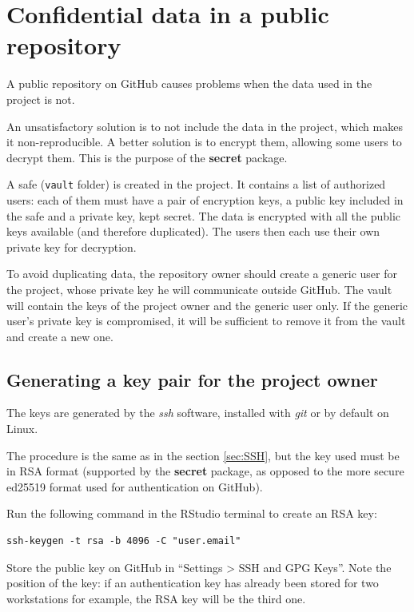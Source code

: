 \documentclass[
  12pt,
  american,
  a4paper,
  extrafontsizes,onecolumn,openright
  ]{memoir}
\begin{document}
\section{Confidential data in a public repository}\label{sec:confidential}

A public repository on GitHub causes problems when the data used in the project is not.

An unsatisfactory solution is to not include the data in the project, which makes it non-reproducible.
A better solution is to encrypt them, allowing some users to decrypt them.
This is the purpose of the \textbf{secret} package.

A safe (\texttt{vault} folder) is created in the project.
It contains a list of authorized users: each of them must have a pair of encryption keys, a public key included in the safe and a private key, kept secret.
The data is encrypted with all the public keys available (and therefore duplicated).
The users then each use their own private key for decryption.

To avoid duplicating data, the repository owner should create a generic user for the project, whose private key he will communicate outside GitHub.
The vault will contain the keys of the project owner and the generic user only.
If the generic user's private key is compromised, it will be sufficient to remove it from the vault and create a new one.

\subsection{Generating a key pair for the project owner}\label{generating-a-key-pair-for-the-project-owner}

The keys are generated by the \emph{ssh} software, installed with \emph{git} or by default on Linux.

The procedure is the same as in the section \ref{sec:SSH}, but the key used must be in RSA format (supported by the \textbf{secret} package, as opposed to the more secure ed25519 format used for authentication on GitHub).

Run the following command in the RStudio terminal to create an RSA key:

\begin{verbatim}
ssh-keygen -t rsa -b 4096 -C "user.email"
\end{verbatim}

Store the public key on GitHub in \enquote{Settings \textgreater{} SSH and GPG Keys}.
Note the position of the key: if an authentication key has already been stored for two workstations for example, the RSA key will be the third one.
\end{document}
